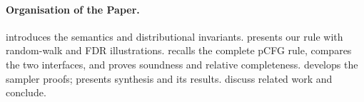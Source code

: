 \paragraph{Organisation of the Paper.}
 introduces the semantics and distributional invariants.
 presents our rule with random-walk and FDR illustrations.
 recalls the complete pCFG rule, compares the two
interfaces, and proves soundness and relative completeness.
 develops the sampler proofs;
 presents synthesis and its results.
 discuss related work and conclude.
